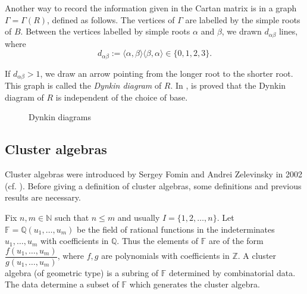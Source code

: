 \documentclass[12pt,a4paper]{article}
\begin{document}
Another way to record the information given in the Cartan matrix is in a graph $\Gamma = \Gamma(R)$, defined as follows. The vertices of $\Gamma$ are labelled by the simple roots of $B$. Between the vertices labelled by simple roots $\alpha$ and $\beta$, we drawn $d_{\alpha\beta}$ lines, where
$$d_{\alpha\beta}:=\langle \alpha , \beta \rangle \langle \beta , \alpha \rangle \in \lbrace 0, 1, 2, 3 \rbrace.$$

If $d_{\alpha\beta}>1$, we draw an arrow pointing from the longer root to the shorter root. This graph is called the \textit{Dynkin diagram} of $R$. In \cite{algebralie}, is proved that the Dynkin diagram of $R$ is independent of the choice of base.


\begin{center}
\begin{figure}[hbtp]
\centering
{}
\caption{Dynkin diagrams}
\end{figure}

\end{center}








\subsection{Cluster algebras}

Cluster algebras were introduced by Sergey Fomin and Andrei Zelevinsky in 2002 (cf. \cite{fomin1}). Before giving a definition of cluster algebras, some definitions and previous results are necessary.

Fix $n,m \in \mathbb{N}$ such that $n\leq m$ and usually $I=\lbrace 1,2,\ldots,n \rbrace$. Let $\mathbb{F}=\mathbb{Q}(u_1,\ldots,u_m)$ be the field of rational functions in the indeterminates $u_1,\ldots, u_m$ with coefficients in $\mathbb{Q}$. Thus the elements of $\mathbb{F}$ are of the form $\dfrac{f(u_1,\ldots,u_m)}{g(u_1,\ldots,u_m)}$, where $f,g$ are polynomials with coefficients in $\mathbb{Z}$. A cluster algebra (of geometric type) is a subring of $\mathbb{F}$ determined by combinatorial data. The data determine a subset of $\mathbb{F}$ which generates the cluster algebra.
\end{document}
